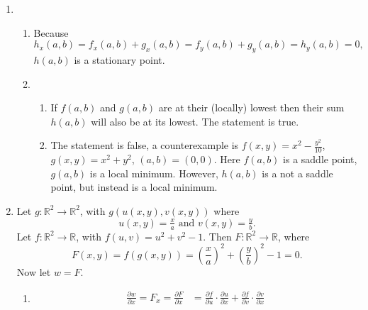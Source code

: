 \documentclass[10pt]{article}
\begin{document}
\begin{enumerate}
\begin{enumerate}
\begin{enumerate}
                    \end{enumerate}
            \end{enumerate}
            \item 
                \begin{enumerate}
                    \item Because $$h_x(a,b) = f_x(a,b) + g_x(a,b) = f_y(a,b) + g_y(a,b) = h_y(a,b) = 0,$$ $h(a,b)$ is a stationary point.
                    \item
                    \begin{enumerate}
                        \item If $f(a,b)$ and $g(a,b)$ are at their (locally)
                            lowest then their sum $h(a,b)$ will also be at its
                            lowest. The statement is true.
                        \item The statement is false, a counterexample is
                            $f(x,y) = x^2 - \tfrac{y^2}{10}$, $g(x,y) = x^2 +
                            y^2$, $(a, b) = (0, 0)$. Here $f(a,b)$ is a saddle
                            point, $g(a,b)$ is a local minimum. However,
                            $h(a,b)$ is a not a saddle point, but instead is a
                            local minimum.
                    \end{enumerate}
                \end{enumerate}
                \item Let $g : \mathbb{R}^2 \longrightarrow \mathbb{R}^2$,
                    with $g(u(x,y),v(x,y))$
                    where
                        $$u(x,y) = \tfrac{x}{a} \text{ and } v(x,y) = \tfrac{y}{b}.$$
                    Let $f : \mathbb{R}^2 \longrightarrow \mathbb{R}$,
                    with $f(u,v) = u^2 + v^2 - 1$.
                    Then $F : \mathbb{R}^2 \longrightarrow \mathbb{R}$,
                    where
                        $$F(x,y) = f(g(x,y)) = \left(\frac{x}{a}\right)^2 + \left(\frac{y}{b}\right)^2 - 1 = 0.$$
                    Now let $w = F$.
                    \begin{enumerate}
                        \item
                            \begin{align*}
                                \frac{\partial w}{\partial x} = F_x = \frac{\partial F}{\partial x} &=
                                \frac{\partial f}{\partial u} \cdot \frac{\partial u}{\partial x} + \frac{\partial f}{\partial v} \cdot \frac{\partial v}{\partial x} \\

\end{align*}
\end{enumerate}
\end{enumerate}
\end{document}

